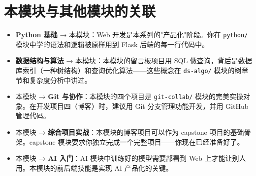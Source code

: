 \documentclass[a4paper,12pt]{ctexart}
\begin{document}
\section*{本模块与其他模块的关联}

\begin{itemize}
  \item \textbf{Python 基础} → 本模块：Web 开发是本系列的"产品化"阶段。你在 \texttt{python/} 模块中学的语法和逻辑被原样用到 Flask 后端的每一行代码中。
  \item \textbf{数据结构与算法} → 本模块：本模块的留言板项目用 SQL 做查询，背后是数据库索引（一种树结构）和查询优化算法——这些概念在 \texttt{ds-algo/} 模块的树章节和复杂度分析中讲过。
  \item 本模块 → \textbf{Git 与协作}：本模块的四个项目是 \texttt{git-collab/} 模块的完美实操对象。在开发项目四（博客）时，建议用 Git 分支管理功能开发，并用 GitHub 管理代码。
  \item 本模块 → \textbf{综合项目实战}：本模块的博客项目可以作为 capstone 项目的基础骨架。capstone 模块要求你独立完成一个完整项目——你现在已经准备好了。
  \item 本模块 → \textbf{AI 入门}：AI 模块中训练好的模型需要部署到 Web 上才能让别人用。本模块的前后端技能是实现 AI 产品化的关键。
\end{itemize}
\end{document}
